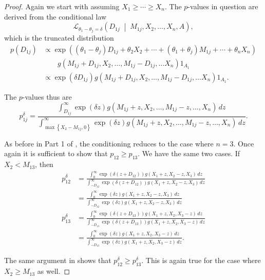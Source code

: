 \documentclass[11pt]{article}
\theoremstyle{definition}
\theoremstyle{custom}
\begin{document}
\begin{proof}
Again we start with assuming $X_1 \ge \cdots \ge X_n$. The $p$-values in question are derived from the conditional law
$$\mathcal{L}_{\theta_1 - \theta_j = \delta} \left(D_{1j} \;\middle|\; M_{1j}, X_2, \ldots, X_n, A\right),$$
which is the truncated distribution
\begin{align*}
p\left(D_{1j}\right) & \propto \exp\left(\left(\theta_1 - \theta_j\right) D_{1j} + \theta_2 X_2 + \cdots + \left(\theta_1 + \theta_j\right) M_{1j} + \cdots + \theta_n X_n \right) \\
& \quad\quad g\left(M_{1j} + D_{1j}, X_2, \ldots, M_{1j} - D_{1j}, \ldots X_n\right) 1_{A_1} \\
& \propto \exp\left(\delta D_{1j}\right) g\left(M_{1j} + D_{1j}, X_2, \ldots, M_{1j} - D_{1j}, \ldots X_n\right) 1_{A_1}.
\end{align*}

The $p$-values thus are
$$p_{1j}^\delta = \frac{\int_{D_{1j}}^\infty \exp\left(\delta z\right) g\left(M_{1j} + z, X_2, \ldots, M_{1j} - z, \ldots, X_n\right) \,dz}{\int_{\max\left\{X_2 - M_{1j}, 0\right\}}^\infty \exp\left(\delta z\right) g\left(M_{1j} + z, X_2, \ldots, M_{1j} - z, \ldots, X_n\right) \,dz}.$$

As before in Part 1 of , the conditioning reduces to the case where $n = 3$. Once again it is sufficient to show that $p_{12} \ge p_{13}$. We have the same two cases. If $X_2 < M_{13}$, then
\begin{align*}
p_{12}^\delta & = \frac{\int_0^\infty \exp\left(\delta \left(z + D_{12}\right)\right) g\left(X_1 + z, X_2 - z, X_3\right) \,dz}{\int_{-D_{12}}^\infty \exp\left(\delta \left(z + D_{12}\right)\right) g\left(X_1 + z, X_2 - z, X_3\right) \,dz} \\
& = \frac{\int_0^\infty \exp\left(\delta z\right) g\left(X_1 + z, X_2 - z, X_3\right) \,dz}{\int_{-D_{12}}^\infty \exp\left(\delta z\right) g\left(X_1 + z, X_2 - z, X_3\right) \,dz} \\
p_{13}^\delta & = \frac{\int_0^\infty \exp\left(\delta \left(z + D_{13}\right)\right) g\left(X_1 + z, X_2, X_3 - z\right) \,dz}{\int_{-D_{13}}^\infty \exp\left(\delta \left(z + D_{13}\right)\right) g\left(X_1 + z, X_2, X_3 - z\right) \,dz} \\
& = \frac{\int_0^\infty \exp\left(\delta z\right) g\left(X_1 + z, X_2, X_3 - z\right) \,dz}{\int_{-D_{13}}^\infty \exp\left(\delta z\right) g\left(X_1 + z, X_2, X_3 - z\right) \,dz}.
\end{align*}

The same argument in  shows that $p_{12}^\delta \ge p_{13}^\delta$. This is again true for the case where $X_2 \ge M_{13}$ as well.
\end{proof}
\end{document}
